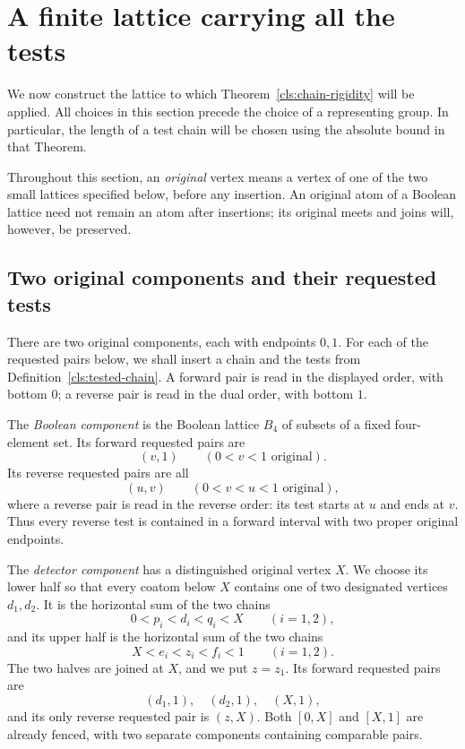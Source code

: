 \section{A finite lattice carrying all the tests}
\label{lat:section}
\label{sec:lattices}

We now construct the lattice to which Theorem~\ref{cls:chain-rigidity}
will be applied.  All choices in this section precede the choice of a
representing group.  In particular, the length of a test chain will be
chosen using the absolute bound in that Theorem.

Throughout this section, an \emph{original} vertex means a vertex of one
of the two small lattices specified below, before any insertion.  An
original atom of a Boolean lattice need not remain an atom after
insertions; its original meets and joins will, however, be preserved.

\subsection{Two original components and their requested tests}

There are two original components, each with endpoints $0,1$.
For each of the requested pairs below, we shall insert a chain and the
tests from Definition~\ref{cls:tested-chain}.  A forward pair is read
in the displayed order, with bottom $0$; a reverse pair is read in
the dual order, with bottom $1$.

The \emph{Boolean component} is the Boolean lattice $B_4$ of subsets
of a fixed four-element set.  Its forward requested pairs are
\begin{equation}
\label{lat:boolean-forward}
   (v,1)\qquad(0<v<1\text{ original}).
\end{equation}
Its reverse requested pairs are all
\begin{equation}
\label{lat:boolean-reverse}
   (u,v)\qquad(0<v<u<1\text{ original}),
\end{equation}
where a reverse pair is read in the reverse order: its test starts at
$u$ and ends at $v$.  Thus every reverse test is contained in a
forward interval with two proper original endpoints.

The \emph{detector component} has a distinguished original vertex
$X$.  We choose its lower half so that every coatom below $X$ contains
one of two designated vertices $d_1,d_2$.  It is the horizontal sum of
the two chains
\begin{equation}
\label{lat:detector-lower}
   0<p_i<d_i<q_i<X\qquad(i=1,2),
\end{equation}
and its upper half is the horizontal sum of the two chains
\begin{equation}
\label{lat:detector-upper}
   X<e_i<z_i<f_i<1\qquad(i=1,2).
\end{equation}
The two halves are joined at $X$, and we put $z=z_1$.
Its forward requested pairs are
\begin{equation}
\label{lat:detector-forward}
   (d_1,1),\quad(d_2,1),\quad(X,1),
\end{equation}
and its only reverse requested pair is $(z,X)$.
Both $[0,X]$ and $[X,1]$ are already fenced, with two separate
components containing comparable pairs.

